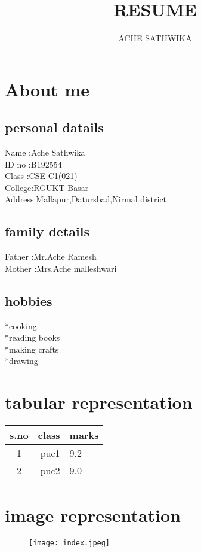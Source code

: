 \documentclass[a4paper,10pt]{article}
\title{RESUME}
\author{ACHE SATHWIKA}
\begin{document}
\maketitle

\section{About me}
\subsection{personal datails}
 Name  :Ache Sathwika\\
 ID no :B192554\\
 Class :CSE C1(021)\\
College:RGUKT Basar\\
Address:Mallapur,Datursbad,Nirmal district\\
\subsection{family details}
Father :Mr.Ache Ramesh\\
Mother :Mrs.Ache malleshwari\\
\subsection{hobbies}
 *cooking\\
 *reading books\\
 *making crafts\\
 *drawing\\
 \section{tabular representation}
 \begin{tabular}{|c|r|l|}
  \hline
  s.no & class & marks\\
  \hline
  1 & puc1 & 9.2\\
  \hline
  2 & puc2 & 9.0\\
  \hline
 \end{tabular}
 \section{image representation}
\begin{figure}
  \texttt{[image: index.jpeg]}
 \end{figure}
\end{document}

